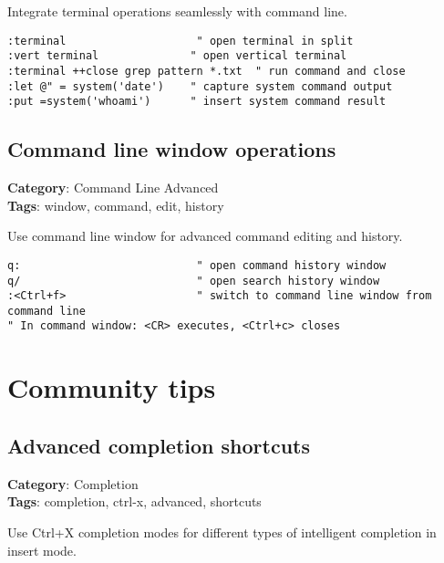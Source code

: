 {{{Integrate terminal operations seamlessly with command line.

\begin{Exa*}{}
\begin{Verbatim}[fontsize=\footnotesize, breaklines, breakanywhere]
:terminal                    " open terminal in split
:vert terminal              " open vertical terminal
:terminal ++close grep pattern *.txt  " run command and close
:let @" = system('date')    " capture system command output
:put =system('whoami')      " insert system command result
\end{Verbatim}
\end{Exa*}

\section{Command line window operations}

\textbf{Category}: Command Line Advanced\\ \textbf{Tags}: window, command, edit, history
\vspace{0.5cm}

Use command line window for advanced command editing and history.

\begin{Exa*}{}
\begin{Verbatim}[fontsize=\footnotesize, breaklines, breakanywhere]
q:                           " open command history window
q/                           " open search history window
:<Ctrl+f>                    " switch to command line window from command line
" In command window: <CR> executes, <Ctrl+c> closes
\end{Verbatim}
\end{Exa*}

\chapter{Community tips}
\section{Advanced completion shortcuts}

\textbf{Category}: Completion\\ \textbf{Tags}: completion, ctrl-x, advanced, shortcuts
\vspace{0.5cm}

Use Ctrl+X completion modes for different types of intelligent completion in insert mode.

}}}
